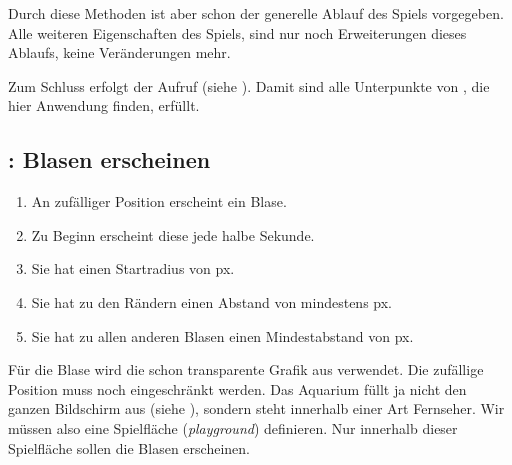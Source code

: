 Durch diese Methoden ist aber schon der generelle Ablauf des Spiels vorgegeben. Alle weiteren Eigenschaften des Spiels, sind nur noch Erweiterungen dieses Ablaufs, keine Veränderungen mehr. 

Zum Schluss erfolgt der Aufruf (siehe ). 
Damit sind alle Unterpunkte von , die hier Anwendung finden, erfüllt.


\subsection{: Blasen erscheinen}

\begin{enumerate}
    \item An zufälliger Position erscheint ein Blase.\label{reqBlasenErscheinenZufall}
    \item Zu Beginn erscheint diese jede halbe Sekunde.\label{reqBlasenErscheinenIntervall}
    \item Sie hat einen Startradius von \unit[15]{px}.\label{reqBlasenErscheinenRadius}
    \item Sie hat zu den Rändern einen Abstand von mindestens \unit[10]{px}.\label{reqBlasenErscheinenAbstand}
    \item Sie hat zu allen anderen Blasen einen Mindestabstand von \unit[10]{px}.\label{reqBlasenErscheinenMindestabstand}
\end{enumerate}
\er


\begin{figure}%
	\begin{center}%
		\vspace{-1cm}%
	\end{center}%
\end{figure}%
Für die Blase wird die schon transparente Grafik aus  verwendet. Die zufällige Position muss noch eingeschränkt werden. Das Aquarium füllt ja nicht den ganzen Bildschirm aus (siehe ), sondern steht innerhalb einer Art Fernseher. Wir müssen also eine Spielfläche (\emph{playground}) definieren. Nur innerhalb dieser Spielfläche sollen die Blasen erscheinen.

